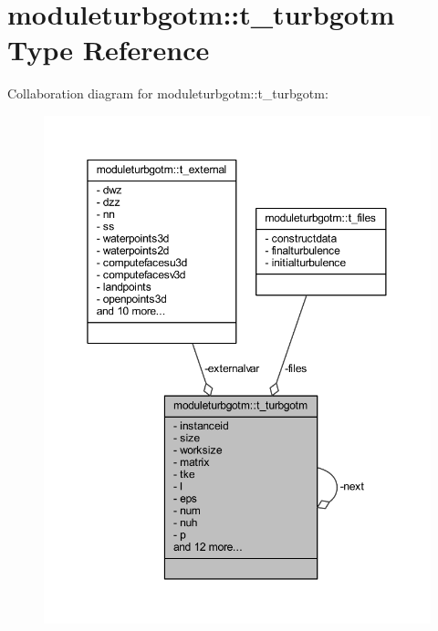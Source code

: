\hypertarget{structmoduleturbgotm_1_1t__turbgotm}{}\section{moduleturbgotm\+:\+:t\+\_\+turbgotm Type Reference}
\label{structmoduleturbgotm_1_1t__turbgotm}


Collaboration diagram for moduleturbgotm\+:\+:t\+\_\+turbgotm\+:\nopagebreak
\begin{figure}[H]
\begin{center}
\leavevmode
\includegraphics[width=350pt]{structmoduleturbgotm_1_1t__turbgotm__coll__graph}
\end{center}
\end{figure}
